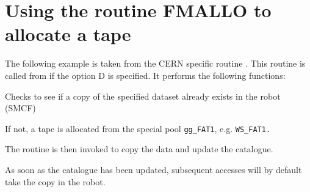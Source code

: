 \section{Using the routine FMALLO to allocate a tape}

The following example is taken from the CERN specific routine .
This routine is called from  if the option D is specified.
It performs the following functions:
\begin{OL}
\item
Checks to see if a copy of the specified dataset already exists in the
robot (SMCF)
\item
If not, a tape is allocated from the special pool {\tt gg\_FAT1}, e.g. 
{\tt WS\_FAT1.}
\item
The  routine is then invoked to copy the data and update the catalogue.
\end{OL}
\par
As soon as the catalogue has been updated, subsequent accesses will by
default take the copy in the robot.
